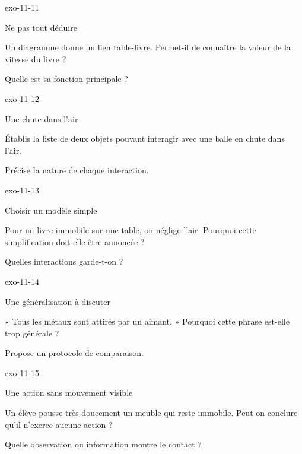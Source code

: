 \documentclass[12pt,twoside,openany]{book}
\begin{document}
\clearpage
\begin{blocLivre}{exo-11-11}
\begin{exercice}[2]{Ne pas tout déduire}
\begin{questions}
\item Un diagramme donne un lien table-livre. Permet-il de connaître la valeur de la vitesse du livre ?
\item Quelle est sa fonction principale ?
\end{questions}
\end{exercice}\end{blocLivre}
\begin{blocLivre}{exo-11-12}
\begin{exercice}[3]{Une chute dans l’air}
\begin{questions}
\item Établis la liste de deux objets pouvant interagir avec une balle en chute dans l’air.
\item Précise la nature de chaque interaction.
\end{questions}
\end{exercice}\end{blocLivre}
\begin{blocLivre}{exo-11-13}
\begin{exercice}[3]{Choisir un modèle simple}
\begin{questions}
\item Pour un livre immobile sur une table, on néglige l’air. Pourquoi cette simplification doit-elle être annoncée ?
\item Quelles interactions garde-t-on ?
\end{questions}
\end{exercice}\end{blocLivre}
\begin{blocLivre}{exo-11-14}
\begin{exercice}[3]{Une généralisation à discuter}
\begin{questions}
\item « Tous les métaux sont attirés par un aimant. » Pourquoi cette phrase est-elle trop générale ?
\item Propose un protocole de comparaison.
\end{questions}
\end{exercice}\end{blocLivre}
\begin{blocLivre}{exo-11-15}
\begin{exercice}[3]{Une action sans mouvement visible}
\begin{questions}
\item Un élève pousse très doucement un meuble qui reste immobile. Peut-on conclure qu’il n’exerce aucune action ?
\item Quelle observation ou information montre le contact ?
\end{questions}
\end{exercice}\end{blocLivre}
\end{document}
